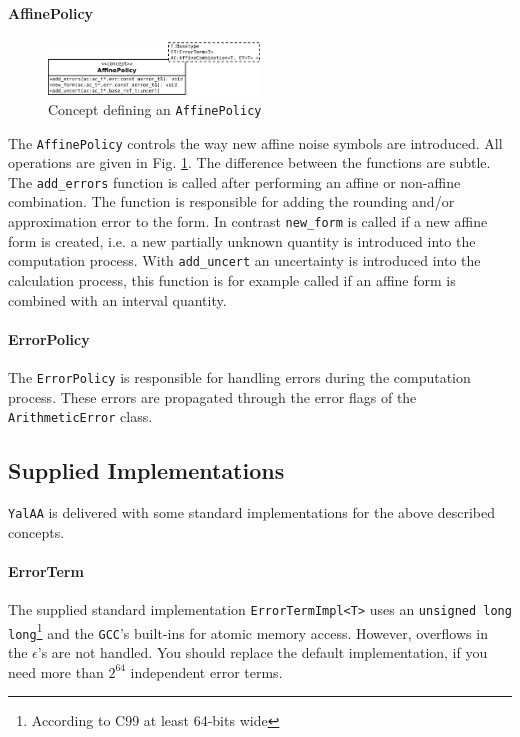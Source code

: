 \documentclass[a4]{scrartcl}
\newcommand{\yalaa}{\texttt{YalAA}\xspace}
\begin{document}
\paragraph{AffinePolicy}
\begin{figure}[h]
  \centering
  \includegraphics[width=0.5\textwidth]{affinepolicy}
  \caption{Concept defining an \texttt{AffinePolicy}}
  \label{fig:affine_policy}
\end{figure}
The \texttt{AffinePolicy} controls the way new affine noise symbols are
introduced. All operations are given in Fig. \ref{fig:affine_policy}. The
difference between the functions are subtle.  The \texttt{add\_errors}
function is called after performing an affine or non-affine combination. The
function is responsible for adding the rounding and/or approximation error to the
form.  In contrast \texttt{new\_form} is called if a new affine form is
created, i.e. a new partially unknown quantity is introduced into the
computation process. With \texttt{add\_uncert} an uncertainty is introduced
into the calculation process, this function is for example called if an affine
form is combined with an interval quantity.

\paragraph{ErrorPolicy}
\label{sec:errorpolicy}
The \texttt{ErrorPolicy} is responsible for handling errors during the
computation process. These errors are propagated through the error flags of the
\texttt{ArithmeticError} class. 

\subsection{Supplied Implementations}
\yalaa is delivered with some standard implementations for the above described
concepts. 
\paragraph{ErrorTerm}
The supplied standard implementation \texttt{ErrorTermImpl<T>} uses an
\texttt{unsigned long long}\footnote{According to C99 at least 64-bits wide}
and the \texttt{GCC}'s built-ins for atomic memory access. However, overflows
in the $\epsilon$'s are not handled. You should replace the default
implementation, if you need more than $2^{64}$ independent error terms.
\end{document}
